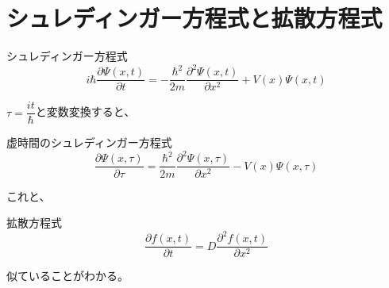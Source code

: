 \documentclass[dvipdfmx]{beamer}
\begin{document}



    \section{シュレディンガー方程式と拡散方程式}

    \begin{frame}
        シュレディンガー方程式
        \begin{equation}
            i\hbar\dfrac{\partial \Psi(x,t)}{\partial t} = -\dfrac{\hbar^2}{2m}\dfrac{\partial^2 \Psi(x,t)}{\partial x^2} + V(x)\Psi(x,t)
        \end{equation}

        $\tau = \dfrac{it}{\hbar}$と変数変換すると、

        \begin{block}{虚時間のシュレディンガー方程式}
            \begin{equation}
                \label{tmp1}
        \dfrac{\partial \Psi(x,\tau)}{\partial \tau} = \dfrac{\hbar^2}{2m}\dfrac{\partial^2 \Psi(x,\tau)}{\partial x^2} - V(x)\Psi(x,\tau)
            \end{equation}
        \end{block}
        これと、
        \begin{block}{拡散方程式}
            \begin{equation}
                \dfrac{\partial f(x,t)}{\partial t} = D \dfrac{\partial^2 f(x,t)}{\partial x^2}
            \end{equation}
        \end{block}
        似ていることがわかる。
    \end{frame}
\end{document}
